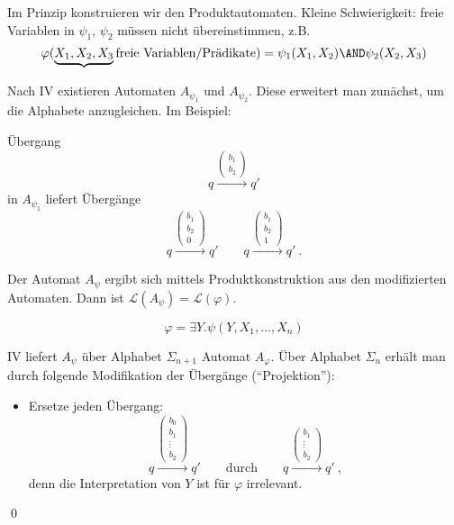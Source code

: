 \begin{description}[style=nextline]
\begin{description}[style=nextline]
    \item[$\varphi = \psi_1 \AND \psi_2$]
    Im Prinzip konstruieren wir den Produktautomaten. Kleine
    Schwierigkeit: freie Variablen in $\psi_1$, $\psi_2$ müssen nicht
    übereinstimmen, z.B.
    \[
      \varphi(\underbrace{X_1,X_2,X_3}{\text{freie Variablen/Prädikate}}) = \psi_1(X_1,X_2) \AND \psi_2(X_2,X_3)
    \]
  \end{description}
  
  Nach IV existieren Automaten $A_{\psi_1}$ und $A_{\psi_2}$. Diese
  erweitert man zunächst, um die Alphabete anzugleichen. Im Beispiel:
  
  Übergang
  \[
    q \xrightarrow{\begin{pmatrix}b_1\\b_2\end{pmatrix}} q' 
  \]
  in $A_{\psi_1}$ liefert Übergänge
  \[
    q \xrightarrow{\begin{pmatrix}b_1\\b_2\\0\end{pmatrix}} q' \qquad
    q \xrightarrow{\begin{pmatrix}b_1\\b_2\\1\end{pmatrix}} q' ~\text{.}
  \]
  
  Der Automat $A_\psi$ ergibt sich mittels Produktkonstruktion aus den
  modifizierten Automaten. Dann ist $\mathcal{L}(A_\psi)=\mathcal{L}(\varphi)$.
\end{description}

\[
  \varphi = \exists Y.\psi(Y, X_1, \dots, X_n)
\]

IV liefert $A_\psi$ über Alphabet $\Sigma_{n+1}$ Automat $A_\varphi$.
Über Alphabet $\Sigma_n$ erhält man durch folgende Modifikation der
Übergänge (\enquote{Projektion}):

\begin{itemize}
  \item Ersetze jeden Übergang:
  \[
    q \xrightarrow{\begin{pmatrix}b_0\\b_1\\\vdots\\b_2\end{pmatrix}} q' 
    \qquad \text{durch} \qquad
    q \xrightarrow{\begin{pmatrix}b_1\\\vdots\\b_2\end{pmatrix}} q' ~\text{,}
  \]
  denn die Interpretation von $Y$ ist für $\varphi$ irrelevant.
\end{itemize}
\qed
